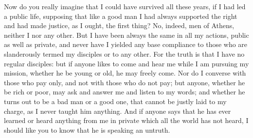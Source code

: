 \documentclass[12pt]{article}
\begin{document}
Now do you really imagine that I could have survived all these years,
if I had led a public life, supposing that like a good man I had always
supported the right and had made justice, as I ought, the first thing?
No, indeed, men of Athens, neither I nor any other. But I have been
always the same in all my actions, public as well as private, and
never have I yielded any base compliance to those who are slanderously
termed my disciples or to any other. For the truth is that I have
no regular disciples: but if anyone likes to come and hear me while
I am pursuing my mission, whether he be young or old, he may freely
come. Nor do I converse with those who pay only, and not with those
who do not pay; but anyone, whether he be rich or poor, may ask and
answer me and listen to my words; and whether he turns out to be a
bad man or a good one, that cannot be justly laid to my charge, as
I never taught him anything. And if anyone says that he has ever learned
or heard anything from me in private which all the world has not heard,
I should like you to know that he is speaking an untruth.
\end{document}

